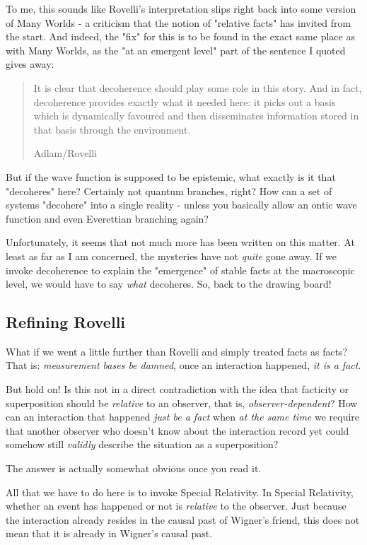 \documentclass{article}
\begin{document}
To me, this sounds like Rovelli's interpretation slips right back into some version of Many Worlds - a criticism that the notion of "relative facts" has invited from the start. And indeed, the "fix" for this is to be found in the exact same place as with Many Worlds, as the "at an emergent level" part of the sentence I quoted gives away:

\blockquote[Adlam/Rovelli]{
It is clear that decoherence should play some role in this story. And in fact, decoherence provides exactly what it needed here: it picks out a basis which is dynamically favoured and then disseminates information stored in that basis through the environment.
}

But if the wave function is supposed to be epistemic, what exactly is it that "decoheres" here? Certainly not quantum branches, right? How can a set of systems "decohere" into a single reality - unless you basically allow an ontic wave function and even Everettian branching again?

Unfortunately, it seems that not much more has been written on this matter. At least as far as I am concerned, the mysteries have not \textit{quite} gone away. If we invoke decoherence to explain the "emergence" of stable facts at the macroscopic level, we would have to say \textit{what} decoheres. So, back to the drawing board!

\subsection{Refining Rovelli}

What if we went a little further than Rovelli and simply treated facts as facts? That is: \textit{measurement bases be damned}, once an interaction happened, \textit{it is a fact}.

But hold on! Is this not in a direct contradiction with the idea that facticity or superposition should be \textit{relative} to an observer, that is, \textit{observer-dependent}? How can an interaction that happened \textit{just be a fact} when \textit{at the same time} we require that another observer who doesn't know about the interaction record yet could somehow still \textit{validly} describe the situation as a superposition?

The answer is actually somewhat obvious once you read it.

All that we have to do here is to invoke Special Relativity. In Special Relativity, whether an event has happened or not is \textit{relative} to the observer. Just because the interaction already resides in the causal past of Wigner's friend, this does not mean that it is already in Wigner's causal past.
\end{document}
